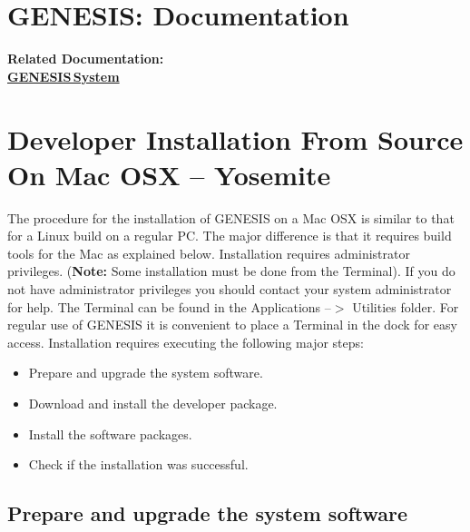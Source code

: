 \documentclass[12pt]{article}
\begin{document}
\section*{GENESIS: Documentation}

{\bf Related Documentation:} \\
\href{../genesis-system/genesis-system.tex}{\bf GENESIS\,System}


\section*{Developer Installation From Source On Mac OSX -- Yosemite}

The procedure for the installation of GENESIS on a Mac OSX is similar to that for a Linux build on a regular PC. The major difference is that it requires build tools for the Mac as explained below. Installation requires administrator privileges. ({\bf Note:} Some installation must be done from the Terminal). If you do not have administrator privileges you should contact your system administrator for help. The Terminal can be found in the Applications --$>$ Utilities folder. For regular use of GENESIS it is convenient to place a Terminal in the dock for easy access.
Installation requires executing the following major steps:
\begin{itemize}
   \item[] Prepare and upgrade the system software.
   \item[] Download and install the developer package.
   \item[] Install the software packages.
   \item[] Check if the installation was successful. 
\end{itemize}

\subsection*{Prepare and upgrade the system software}
\end{document}
